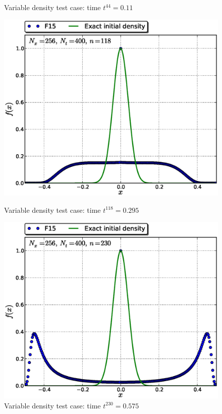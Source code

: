 \documentclass[11pt,titlepage]{report}
\begin{document}
\begin{figure}[h!]
\begin{minipage}[b]{0.5\linewidth}
\caption{Variable density test case: time $t^{44} = 0.11$}
\vspace{4ex}
\end{minipage} 
\begin{minipage}[b]{0.5\linewidth}
\centering
\includegraphics[width=\linewidth]{graphics/f_N_v_S_F15_Nx256Nt400_w_f0_it00118}
\caption{Variable density test case: time $t^{118} = 0.295$}
\vspace{4ex}
\end{minipage}%
\begin{minipage}[b]{0.5\linewidth}
\centering
\includegraphics[width=\linewidth]{graphics/f_N_v_S_F15_Nx256Nt400_w_f0_it00230}
\caption{Variable density test case: time $t^{230} = 0.575$}
\vspace{4ex}
\end{minipage} 
\end{figure}
\end{document}
